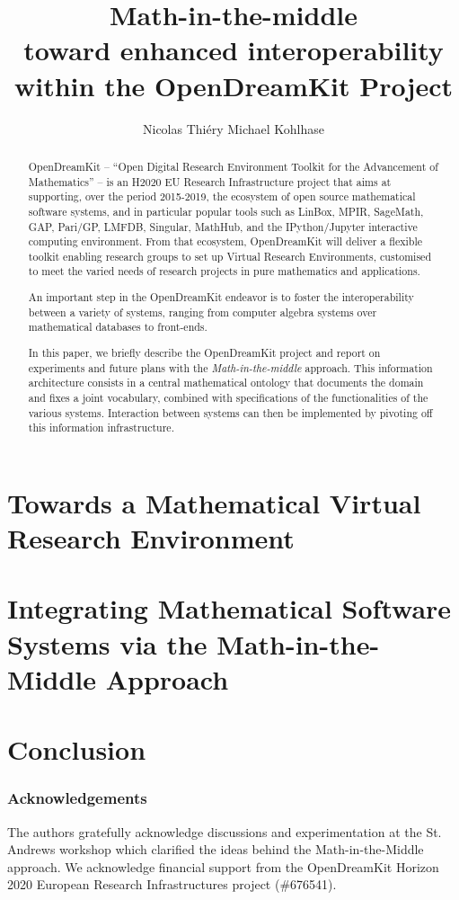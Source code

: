 \documentclass[orivec]{llncs}
\title{Math-in-the-middle\\
  toward enhanced interoperability\\
  within the OpenDreamKit Project}
\author{Nicolas Thi\'ery\inst{1} Michael Kohlhase\inst{2}}
\institute{Universit\'e Paris-Sud, Paris, France\and
Jacobs University, Bremen, Germany}
\begin{document}
\maketitle
\begin{abstract}
  OpenDreamKit -- ``Open Digital Research Environment Toolkit for the
  Advancement of Mathematics'' -- is an H2020 EU Research
  Infrastructure project that aims at supporting, over the period
  2015-2019, the ecosystem of open source mathematical software
  systems, and in particular popular tools such as LinBox, MPIR,
  SageMath, GAP, Pari/GP, LMFDB, Singular, MathHub, and the
  IPython/Jupyter interactive computing environment. From that
  ecosystem, OpenDreamKit will deliver a flexible toolkit enabling
  research groups to set up Virtual Research Environments, customised
  to meet the varied needs of research projects in pure mathematics
  and applications.

  An important step in the OpenDreamKit endeavor is to foster the
  interoperability between a variety of systems, ranging from computer
  algebra systems over mathematical databases to front-ends.

  In this paper, we briefly describe the OpenDreamKit project and report on
  experiments and future plans with the \emph{Math-in-the-middle} approach.
  This information architecture consists in a central mathematical
  ontology that documents the domain and fixes a joint vocabulary,
  combined with specifications of the functionalities of the various
  systems. Interaction between systems can then be implemented by
  pivoting off this information infrastructure.
\end{abstract}

\section{Towards a Mathematical Virtual Research Environment}

\section{Integrating Mathematical Software Systems via the Math-in-the-Middle Approach}
\section{Conclusion}
\subsubsection*{Acknowledgements}
The authors gratefully acknowledge discussions and experimentation at the St. Andrews
workshop which clarified the ideas behind the
Math-in-the-Middle approach. We acknowledge financial support from the OpenDreamKit
Horizon 2020 European Research Infrastructures project (\#676541).

\printbibliography
\end{document}
